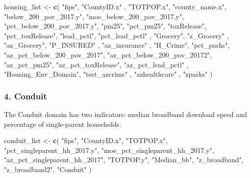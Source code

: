 \documentclass[]{article}
\newenvironment{Shaded}{\begin{snugshade}}{\end{snugshade}}
\newcommand{\KeywordTok}[1]{\textcolor[rgb]{0.13,0.29,0.53}{\textbf{#1}}}
\newcommand{\StringTok}[1]{\textcolor[rgb]{0.31,0.60,0.02}{#1}}
\newcommand{\NormalTok}[1]{#1}
\begin{document}
\begin{Shaded}
\begin{Highlighting}[]
\NormalTok{housing_list <-}
\StringTok{  }\KeywordTok{c}\NormalTok{(}
  \StringTok{"fips"}\NormalTok{,}
  \StringTok{"CountyID.x"}\NormalTok{ ,}
  \StringTok{"TOTPOP.x"}\NormalTok{,}
  \StringTok{"county_name.x"}\NormalTok{,}
  \StringTok{"below_200_pov_2017.y"}\NormalTok{,}
  \StringTok{"moe_below_200_pov_2017.y"}\NormalTok{,}
  \StringTok{"pct_below_200_pov_2017.y"}\NormalTok{,}
  \StringTok{"pm25"}\NormalTok{,}
  \StringTok{"pct_pm25"}\NormalTok{,}
  \StringTok{"toxRelease"}\NormalTok{,}
  \StringTok{"pct_toxRelease"}\NormalTok{,}
  \StringTok{"lead_pctl"}\NormalTok{,}
  \StringTok{"pct_lead_pctl"}\NormalTok{ ,}
  \StringTok{"Grocery"}\NormalTok{,}
  \StringTok{"z_Grocery"}\NormalTok{ ,}
  \StringTok{"az_Grocery"}\NormalTok{,}
  \StringTok{"P_INSURED"}\NormalTok{ ,}
  \StringTok{"az_insurance"}\NormalTok{ ,}
  \StringTok{"H_Crime"}\NormalTok{,}
  \StringTok{"pct_parks"}\NormalTok{,}
  \StringTok{"az_pct_below_200_pov_2017"}\NormalTok{,}
  \StringTok{"az_pct_below_200_pov_20172"}\NormalTok{,}
  \StringTok{"az_pct_pm25"}\NormalTok{,}
  \StringTok{"az_pct_toxRelease"}\NormalTok{,}
  \StringTok{"az_pct_lead_pctl"}\NormalTok{ ,}
  \StringTok{"Housing_Env_Domain"}\NormalTok{,}
  \StringTok{"test_azcrime"}\NormalTok{ ,}
  \StringTok{"azhealthcare"}\NormalTok{ ,}
  \StringTok{"zparks"}
\NormalTok{  )}
\end{Highlighting}
\end{Shaded}

\subsubsection{4. Conduit}\label{conduit}

The Conduit domain has two indicators: median broadband download speed
and percentage of single-parent households.

\begin{Shaded}
\begin{Highlighting}[]
\NormalTok{conduit_list <-}
\StringTok{  }\KeywordTok{c}\NormalTok{(}
  \StringTok{"fips"}\NormalTok{,}
  \StringTok{"CountyID.x"}\NormalTok{,}
  \StringTok{"TOTPOP.x"}\NormalTok{,}
  \StringTok{"pct_singleparent_hh_2017.y"}\NormalTok{,}
  \StringTok{"moe_pct_singleparent_hh_2017.y"}\NormalTok{,}
  \StringTok{"az_pct_singleparent_hh_2017"}\NormalTok{,}
  \StringTok{"TOTPOP.y"}\NormalTok{,}
  \StringTok{"Median_bb"}\NormalTok{,}
  \StringTok{"z_broadband"}\NormalTok{,}
  \StringTok{"z_broadband2"}\NormalTok{,}
  \StringTok{"Conduit"}
\NormalTok{  )}
\end{Highlighting}
\end{Shaded}
\end{document}
